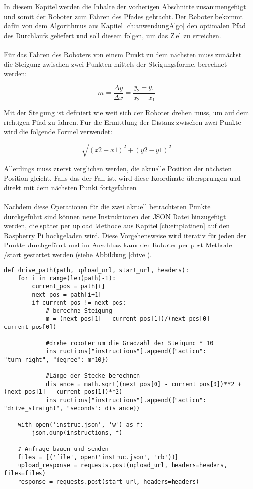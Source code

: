 \label{ch:anwendungRobot}
In diesem Kapitel werden die Inhalte der vorherigen Abschnitte zusammengefügt und somit der Roboter zum Fahren des Pfades gebracht. Der Roboter bekommt dafür von dem Algorithmus aus Kapitel \ref{ch:anwendungAlgo} den optimalen Pfad des Durchlaufs geliefert und soll diesem folgen, um das Ziel zu erreichen.\\\\
Für das Fahren des Roboters von einem Punkt zu dem nächsten muss zunächst die Steigung zwischen zwei Punkten mittels der Steigungsformel berechnet werden:

    \[m = \frac{\Delta y}{\Delta x} = \frac{y_2 - y_1}{x_2 - x_1}\]

Mit der Steigung ist definiert wie weit sich der Roboter drehen muss, um auf dem richtigen Pfad zu fahren. Für die Ermittlung der Distanz zwischen zwei Punkte wird die folgende Formel verwendet:

    \[\sqrt{(x2 - x1)^2 + (y2 -y1)^2}\]
    
Allerdings muss zuerst verglichen werden, die aktuelle Position der nächsten Position gleicht. Falls das der Fall ist, wird diese Koordinate übersprungen und direkt mit dem nächsten Punkt fortgefahren. \\\\
Nachdem diese Operationen für die zwei aktuell betrachteten Punkte durchgeführt sind können neue Instruktionen der JSON Datei hinzugefügt werden, die später per \glqq upload\grqq{} Methode aus Kapitel \ref{ch:einplatinen} auf den Raspberry Pi hochgeladen wird. Diese Vorgehensweise wird iterativ für jeden der Punkte durchgeführt und im Anschluss kann der Roboter per post Methode \glqq /start\grqq{} gestartet werden (siehe Abbildung \ref{drive}).
    \begin{verbatim}
def drive_path(path, upload_url, start_url, headers):
    for i in range(len(path)-1):
        current_pos = path[i]
        next_pos = path[i+1]
        if current_pos != next_pos:
            # berechne Steigung
            m = (next_pos[1] - current_pos[1])/(next_pos[0] - current_pos[0])   

            #drehe roboter um die Gradzahl der Steigung * 10
            instructions["instructions"].append({"action": "turn_right", "degree": m*10})
            
            #Länge der Stecke berechnen
            distance = math.sqrt((next_pos[0] - current_pos[0])**2 + (next_pos[1] - current_pos[1])**2)
            instructions["instructions"].append({"action": "drive_straight", "seconds": distance})

    with open('instruc.json', 'w') as f:
        json.dump(instructions, f)

    # Anfrage bauen und senden
    files = [('file', open('instruc.json', 'rb'))]
    upload_response = requests.post(upload_url, headers=headers, files=files)
    response = requests.post(start_url, headers=headers)
        \end{verbatim}
        \vspace*{-3mm}
        \vspace*{3mm}